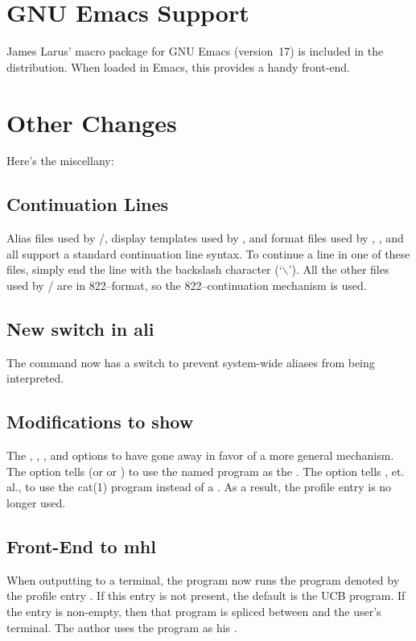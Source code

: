 \section*	{GNU Emacs Support}
James Larus'  macro package for GNU Emacs (version~17) is included
in the distribution.
When loaded in Emacs, this provides a handy front-end.

\section*	{Other Changes}
Here's the miscellany:

\subsection*	{Continuation Lines}
Alias files used by \MH/,
display templates used by ,
and format files used by , , and  all support
a standard continuation line syntax.
To continue a line in one of these files,
simply end the line with the backslash character (`$\backslash$').
All the other files used by \MH/ are in 822--format,
so the 822--continuation mechanism is used.%

\subsection*	{New switch in ali}
The  command now has a  switch to prevent
system-wide aliases from being interpreted.

\subsection*	{Modifications to show}
The , , , and 
options to  have gone away in favor of a more general mechanism.
The  option tells 
(or  or ) to use the named program as the .
The  option tells , et. al.,
to use the \man cat(1) program instead of a .
As a result, the profile entry  is no longer used.

\subsection*	{Front-End to mhl}
When outputting to a terminal,
the  program now runs the program denoted by the profile entry
.
If this entry is not present,
the default is the UCB  program.
If the entry is non-empty,
then that program is spliced between  and the user's terminal.
The author uses the  program as his .

